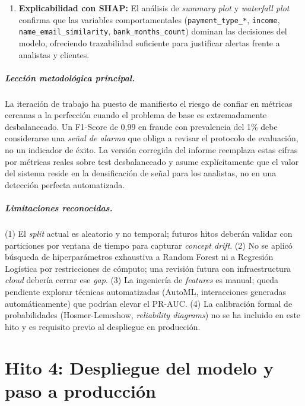 \documentclass[12pt,a4paper]{report}
\begin{document}
\begin{enumerate}
    \item \textbf{Explicabilidad con SHAP:} El análisis de \textit{summary plot} y \textit{waterfall plot} confirma que las variables comportamentales (\texttt{payment\_type\_*}, \texttt{income}, \texttt{name\_email\_similarity}, \texttt{bank\_months\_count}) dominan las decisiones del modelo, ofreciendo trazabilidad suficiente para justificar alertas frente a analistas y clientes.
\end{enumerate}

\paragraph{Lección metodológica principal.} La iteración de trabajo ha puesto de manifiesto el riesgo de confiar en métricas cercanas a la perfección cuando el problema de base es extremadamente desbalanceado. Un F1-Score de 0,99 en fraude con prevalencia del 1\% debe considerarse una \textit{señal de alarma} que obliga a revisar el protocolo de evaluación, no un indicador de éxito. La versión corregida del informe reemplaza estas cifras por métricas reales sobre test desbalanceado y asume explícitamente que el valor del sistema reside en la densificación de señal para los analistas, no en una detección perfecta automatizada.

\paragraph{Limitaciones reconocidas.} (1) El \textit{split} actual es aleatorio y no temporal; futuros hitos deberán validar con particiones por ventana de tiempo para capturar \textit{concept drift}. (2) No se aplicó búsqueda de hiperparámetros exhaustiva a Random Forest ni a Regresión Logística por restricciones de cómputo; una revisión futura con infraestructura \textit{cloud} debería cerrar ese \textit{gap}. (3) La ingeniería de \textit{features} es manual; queda pendiente explorar técnicas automatizadas (AutoML, interacciones generadas automáticamente) que podrían elevar el PR-AUC. (4) La calibración formal de probabilidades (Hosmer-Lemeshow, \textit{reliability diagrams}) no se ha incluido en este hito y es requisito previo al despliegue en producción.



\chapter{Hito 4: Despliegue del modelo y paso a producción}
\label{ch:hito4}
\end{document}

